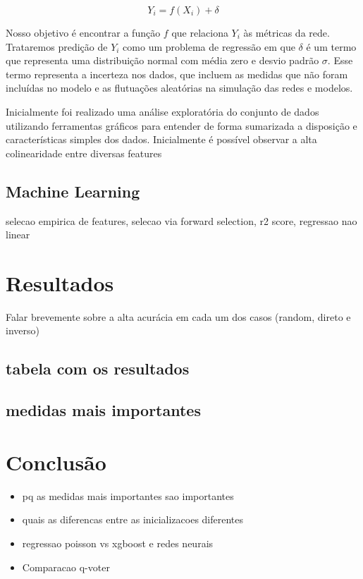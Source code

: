 \documentclass{article}
\begin{document}
$$
Y_i = f(X_i)+\delta
$$

Nosso objetivo é encontrar a função $f$ que relaciona $Y_i$ às métricas da rede. Trataremos predição de $Y_i$ como um problema de regressão em que $\delta$ é um termo que representa uma distribuição normal com média zero e desvio padrão $\sigma$. Esse termo representa a incerteza nos dados, que incluem as medidas que não foram incluídas no modelo e as flutuações aleatórias na simulação das redes e modelos.

Inicialmente foi realizado uma análise exploratória do conjunto de dados utilizando ferramentas gráficos para entender de forma sumarizada a disposição e características simples dos dados. Inicialmente é possível observar a alta colinearidade entre diversas features 



\subsection{Machine Learning}
selecao empirica de features, selecao via forward selection, r2 score, regressao nao linear

\section{Resultados}
Falar brevemente sobre a alta acurácia em cada um dos casos (random, direto e inverso)
\subsection{tabela com os resultados}
\subsection{medidas mais importantes}
\section{Conclusão}
\begin{itemize}
    \item{pq as medidas mais importantes sao importantes}
    \item{quais as diferencas entre as inicializacoes diferentes}
    \item{regressao poisson vs xgboost e redes neurais}
    \item{Comparacao q-voter}
\end{itemize}



\end{document}
